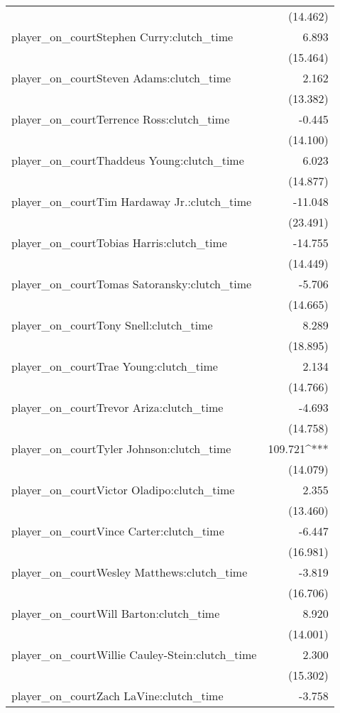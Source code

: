 \documentclass[
  landscape]{article}
\begin{document}
\begin{table}[!htbp]
\begin{tabular}{@{\extracolsep{5pt}}lD{.}{.}{-3} }
  & (14.462) \\ 
  player\_on\_courtStephen Curry:clutch\_time & 6.893 \\ 
  & (15.464) \\ 
  player\_on\_courtSteven Adams:clutch\_time & 2.162 \\ 
  & (13.382) \\ 
  player\_on\_courtTerrence Ross:clutch\_time & -0.445 \\ 
  & (14.100) \\ 
  player\_on\_courtThaddeus Young:clutch\_time & 6.023 \\ 
  & (14.877) \\ 
  player\_on\_courtTim Hardaway Jr.:clutch\_time & -11.048 \\ 
  & (23.491) \\ 
  player\_on\_courtTobias Harris:clutch\_time & -14.755 \\ 
  & (14.449) \\ 
  player\_on\_courtTomas Satoransky:clutch\_time & -5.706 \\ 
  & (14.665) \\ 
  player\_on\_courtTony Snell:clutch\_time & 8.289 \\ 
  & (18.895) \\ 
  player\_on\_courtTrae Young:clutch\_time & 2.134 \\ 
  & (14.766) \\ 
  player\_on\_courtTrevor Ariza:clutch\_time & -4.693 \\ 
  & (14.758) \\ 
  player\_on\_courtTyler Johnson:clutch\_time & 109.721^{***} \\ 
  & (14.079) \\ 
  player\_on\_courtVictor Oladipo:clutch\_time & 2.355 \\ 
  & (13.460) \\ 
  player\_on\_courtVince Carter:clutch\_time & -6.447 \\ 
  & (16.981) \\ 
  player\_on\_courtWesley Matthews:clutch\_time & -3.819 \\ 
  & (16.706) \\ 
  player\_on\_courtWill Barton:clutch\_time & 8.920 \\ 
  & (14.001) \\ 
  player\_on\_courtWillie Cauley-Stein:clutch\_time & 2.300 \\ 
  & (15.302) \\ 
  player\_on\_courtZach LaVine:clutch\_time & -3.758 \\ 

\end{tabular}
\end{table}
\end{document}
